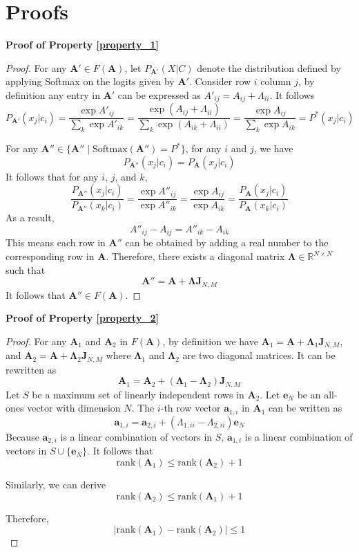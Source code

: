 
\appendix

\section{Proofs}
\label{sec:a-proof}

\textbf{Proof of Property \ref{property_1}}

\begin{proof}
For any $\mathbf{A}' \in F(\mathbf{A})$, let $P_{\mathbf{A'}}(X | C)$ denote the distribution defined by applying Softmax on the logits given by $\mathbf{A}'$. Consider row $i$ column $j$, by definition any entry in $\mathbf{A}'$ can be expressed as $A'_{ij} = A_{ij} + \Lambda_{ii}$. It follows 
\[
P_{\mathbf{A}'}(x_j | c_i) = \frac{\exp A'_{ij}}{\sum_k \exp A'_{ik}} = \frac{\exp (A_{ij} + \Lambda_{ii})}{\sum_k \exp (A_{ik} + \Lambda_{ii})} = \frac{\exp A_{ij}}{\sum_k \exp A_{ik}} = P^*(x_j | c_i)
\]

For any $\mathbf{A}'' \in \{\mathbf{A}'' \mid \textrm{Softmax}(\mathbf{A}'') = P^* \}$, for any $i$ and $j$, we have
\[
P_{\mathbf{A}''} (x_j | c_i) = P_{\mathbf{A}} (x_j | c_i)
\]
It follows that for any $i$, $j$, and $k$,
\[
\frac{P_{\mathbf{A}''} (x_j | c_i)}{P_{\mathbf{A}''} (x_k | c_i)} = \frac{\exp A''_{ij}}{\exp A''_{ik}} = \frac{\exp A_{ij}}{\exp A_{ik}} = \frac{P_{\mathbf{A}}(x_j | c_i)}{P_{\mathbf{A}}(x_k | c_i)}
\]
As a result,
\[
A''_{ij} - A_{ij} = A''_{ik} - A_{ik}
\]
This means each row in $\mathbf{A}''$ can be obtained by adding a real number to the corresponding row in $\mathbf{A}$. Therefore, there exists a diagonal matrix $\mathbf{\Lambda} \in \mathbb{R}^{N \times N}$ such that
\[
\mathbf{A}'' = \mathbf{A} + \mathbf{\Lambda} \mathbf{J}_{N,M}
\]
It follows that $\mathbf{A}'' \in F(\mathbf{A})$.
\end{proof}

\textbf{Proof of Property \ref{property_2}}

\begin{proof}
For any $\mathbf{A}_1$ and $\mathbf{A}_2$ in $F(\mathbf{A})$, by definition we have $\mathbf{A}_1 = \mathbf{A} + \mathbf{\Lambda}_1 \mathbf{J}_{N,M}$, and $\mathbf{A}_2 = \mathbf{A} + \mathbf{\Lambda}_2 \mathbf{J}_{N,M}$ where $\mathbf{\Lambda}_1$ and $\mathbf{\Lambda}_2$ are two diagonal matrices. It can be rewritten as
\[
\mathbf{A}_1 = \mathbf{A}_2 + (\mathbf{\Lambda}_1 - \mathbf{\Lambda}_2) \mathbf{J}_{N,M}
\]
Let $S$ be a maximum set of linearly independent rows in $\mathbf{A}_2$. Let $\mathbf{e}_N$ be an all-ones vector with dimension $N$. The $i$-th row vector $\mathbf{a}_{1,i}$ in $\mathbf{A}_1$ can be written as
\[
\mathbf{a}_{1,i} = \mathbf{a}_{2,i} + (\Lambda_{1,ii} - \Lambda_{2,ii}) \mathbf{e}_N
\]
Because $\mathbf{a}_{2,i}$ is a linear combination of vectors in $S$, $\mathbf{a}_{1,i}$ is a linear combination of vectors in $S \cup \{\mathbf{e}_N\}$. It follows that
\[
\text{rank}(\mathbf{A}_1) \leq \text{rank}(\mathbf{A}_2) + 1
\]

Similarly, we can derive
\[
\text{rank}(\mathbf{A}_2) \leq \text{rank}(\mathbf{A}_1) + 1
\]

Therefore,
\[
|\text{rank}(\mathbf{A}_1) - \text{rank}(\mathbf{A}_2)| \leq 1
\]
\end{proof}

